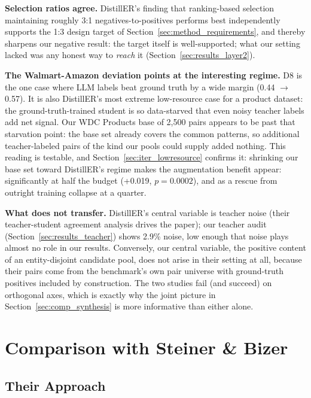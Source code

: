 \documentclass[a4paper,oneside,bibliography=totoc]{scrbook}
\begin{document}
\textbf{Selection ratios agree.} DistillER's finding that ranking-based selection maintaining roughly 3:1 negatives-to-positives performs best independently supports the 1:3 design target of Section~\ref{sec:method_requirements}, and thereby sharpens our negative result: the target itself is well-supported; what our setting lacked was any honest way to \emph{reach} it (Section~\ref{sec:results_layer2}).

\textbf{The Walmart-Amazon deviation points at the interesting regime.} D8 is the one case where LLM labels beat ground truth by a wide margin (0.44 $\rightarrow$ 0.57). It is also DistillER's most extreme low-resource case for a product dataset: the ground-truth-trained student is so data-starved that even noisy teacher labels add net signal. Our WDC Products base of 2{,}500 pairs appears to be past that starvation point: the base set already covers the common patterns, so additional teacher-labeled pairs of the kind our pools could supply added nothing. This reading is testable, and Section~\ref{sec:iter_lowresource} confirms it: shrinking our base set toward DistillER's regime makes the augmentation benefit appear: significantly at half the budget (+0.019, $p = 0.0002$), and as a rescue from outright training collapse at a quarter.

\textbf{What does not transfer.} DistillER's central variable is teacher noise (their teacher-student agreement analysis drives the paper); our teacher audit (Section~\ref{sec:results_teacher}) shows 2.9\% noise, low enough that noise plays almost no role in our results. Conversely, our central variable, the positive content of an entity-disjoint candidate pool, does not arise in their setting at all, because their pairs come from the benchmark's own pair universe with ground-truth positives included by construction. The two studies fail (and succeed) on orthogonal axes, which is exactly why the joint picture in Section~\ref{sec:comp_synthesis} is more informative than either alone.

\section{Comparison with Steiner \& Bizer}
\label{sec:comp_aaron}

\subsection{Their Approach}
\label{sec:comp_aaron_approach}
\end{document}
